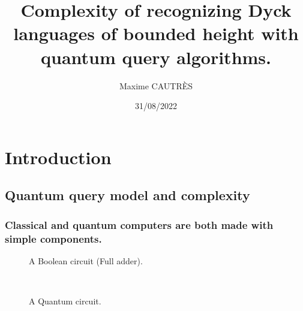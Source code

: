 \documentclass[9pt, notheorems]{beamer}
\title[QQC of bounded height Dyck languages.]{{\huge Complexity of recognizing Dyck languages
of bounded height with quantum query algorithms.}}
\author{Maxime CAUTRÈS}
\institute{Faculty of Computing\\ University of Latvia}
\date{31/08/2022}
\theoremstyle{definition}
\theoremstyle{plain}
\theoremstyle{definition}
\begin{document}
\begin{frame}
    \titlepage
\end{frame}

\section{Introduction}


\subsection{Quantum query model and complexity}

\begin{frame}
    \frametitle{Classical and quantum computers are both made with simple components.}
    \begin{minipage}{.45\textwidth}
        \begin{figure}
            
            \caption{A Boolean circuit (Full adder).}
        \end{figure}
    \end{minipage}
    \hfill
    \begin{minipage}{.45\textwidth}
        \begin{figure}
            \vspace*{.5cm}
            \\[.8cm]
            \caption{A Quantum circuit.}
        \end{figure}
    \end{minipage}
\end{frame}
\end{document}
